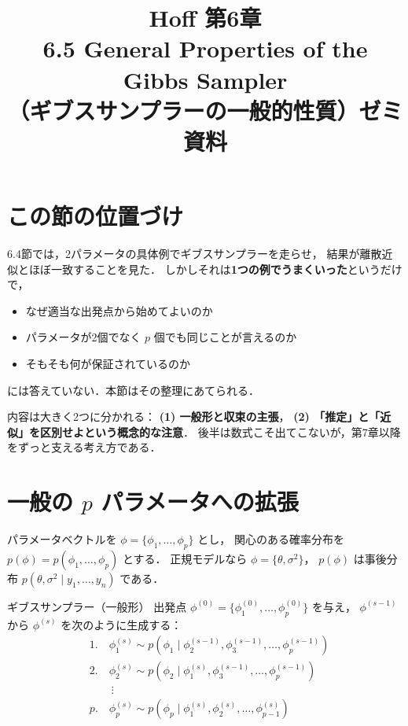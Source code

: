 \documentclass[lualatex,ja=standard,a4paper,12pt]{bxjsarticle}
\title{{\large Hoff 第6章} \\[6pt]
       \textbf{6.5\; General Properties of the Gibbs Sampler} \\[4pt]
       {\normalsize （ギブスサンプラーの一般的性質）ゼミ資料}}
\author{}
\date{}
\begin{document}
\maketitle
\thispagestyle{empty}

\section{この節の位置づけ}

6.4節では，2パラメータの具体例でギブスサンプラーを走らせ，
結果が離散近似とほぼ一致することを見た．
しかしそれは\textbf{1つの例でうまくいった}というだけで，

\begin{itemize}
  \item なぜ適当な出発点から始めてよいのか
  \item パラメータが2個でなく $p$ 個でも同じことが言えるのか
  \item そもそも何が保証されているのか
\end{itemize}

\noindent には答えていない．本節はその整理にあてられる．

\medskip
内容は大きく2つに分かれる：
\textbf{(1) 一般形と収束の主張}，
\textbf{(2) 「推定」と「近似」を区別せよという概念的な注意}．
後半は数式こそ出てこないが，第7章以降をずっと支える考え方である．

\section{一般の $p$ パラメータへの拡張}

パラメータベクトルを $\phi = \{\phi_1, \ldots, \phi_p\}$ とし，
関心のある確率分布を $p(\phi) = p(\phi_1, \ldots, \phi_p)$ とする．
正規モデルなら $\phi = \{\theta, \sigma^2\}$，
$p(\phi)$ は事後分布 $p(\theta, \sigma^2 \mid y_1, \ldots, y_n)$ である．

\begin{defbox}{ギブスサンプラー（一般形）}
出発点 $\phi^{(0)} = \{\phi_1^{(0)}, \ldots, \phi_p^{(0)}\}$ を与え，
$\phi^{(s-1)}$ から $\phi^{(s)}$ を次のように生成する：
\begin{align*}
  &1.\quad \phi_1^{(s)} \sim p\!\left(\phi_1 \mid \phi_2^{(s-1)}, \phi_3^{(s-1)}, \ldots, \phi_p^{(s-1)}\right) \\
  &2.\quad \phi_2^{(s)} \sim p\!\left(\phi_2 \mid \phi_1^{(s)}, \phi_3^{(s-1)}, \ldots, \phi_p^{(s-1)}\right) \\
  &\qquad \vdots \\
  &p.\quad \phi_p^{(s)} \sim p\!\left(\phi_p \mid \phi_1^{(s)}, \phi_2^{(s)}, \ldots, \phi_{p-1}^{(s)}\right)
\end{align*}
\end{defbox}
\end{document}
